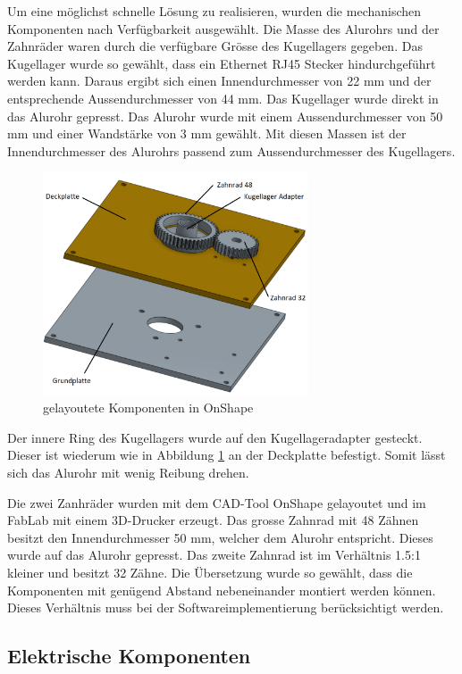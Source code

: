 Um eine möglichst schnelle Lösung zu realisieren, wurden die mechanischen Komponenten nach Verfügbarkeit ausgewählt. Die Masse des Alurohrs und der Zahnräder waren durch die verfügbare Grösse des Kugellagers gegeben. Das Kugellager wurde so gewählt, dass ein Ethernet RJ45 Stecker hindurchgeführt werden kann. Daraus ergibt sich einen Innendurchmesser von 22 mm und der entsprechende Aussendurchmesser von 44 mm.
Das Kugellager wurde direkt in das Alurohr gepresst. Das Alurohr wurde mit einem Aussendurchmesser von 50 mm und einer Wandstärke von 3 mm gewählt. Mit diesen Massen ist der Innendurchmesser des Alurohrs passend zum Aussendurchmesser des Kugellagers.


\begin{figure}[H]
	\centering
	\includegraphics[width=0.7\textwidth]{resources/mechKomp2.PNG}
	\caption[gelayoutete Komponenten in OnShape]{gelayoutete Komponenten in OnShape}
	\label{fig:mechKomp}
\end{figure} 

Der innere Ring des Kugellagers wurde auf den Kugellageradapter gesteckt. Dieser ist wiederum wie in Abbildung \ref{fig:mechKomp} an der Deckplatte befestigt. Somit lässt sich das Alurohr mit wenig Reibung drehen.

Die zwei Zanhräder wurden mit dem CAD-Tool OnShape gelayoutet und im FabLab mit einem 3D-Drucker erzeugt. Das grosse Zahnrad mit 48 Zähnen besitzt den Innendurchmesser 50 mm, welcher dem Alurohr entspricht. Dieses wurde auf das Alurohr gepresst. Das zweite Zahnrad ist im Verhältnis 1.5:1 kleiner und besitzt 32 Zähne. Die Übersetzung wurde so gewählt, dass die Komponenten mit genügend Abstand nebeneinander montiert werden können. Dieses Verhältnis muss bei der Softwareimplementierung berücksichtigt werden.

\subsection {Elektrische Komponenten}
\label{sec:elekKomp}

